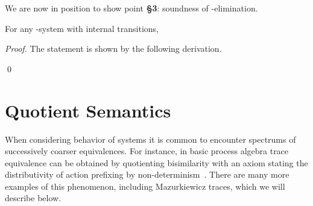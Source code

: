 \documentclass[oribibl,envcountsame,envcountsect,runningheads]{llncs}
\renewcommand{\>}{\rangle}
\begin{document}
\noindent We are now in position to show point {\bf \S 3}: soundness of -elimination.
\newcommand{\propEpsilonElimSound}{For any -system  with internal transitions,

}
\begin{theorem} \label{th:epselimsound}
\propEpsilonElimSound
\end{theorem}
\begin{proof} The statement is shown by the following derivation.

\qed
\end{proof}
\section{Quotient Semantics}\label{ssec:quot}
When considering behavior of systems it is common to encounter spectrums of successively coarser equivalences. For instance, in basic process algebra trace equivalence can be obtained by quotienting bisimilarity with an axiom stating the distributivity of action prefixing by non-determinism~\cite{Rabinovich93}. There are many more examples of this phenomenon, including Mazurkiewicz traces, which we will describe below.
\end{document}
